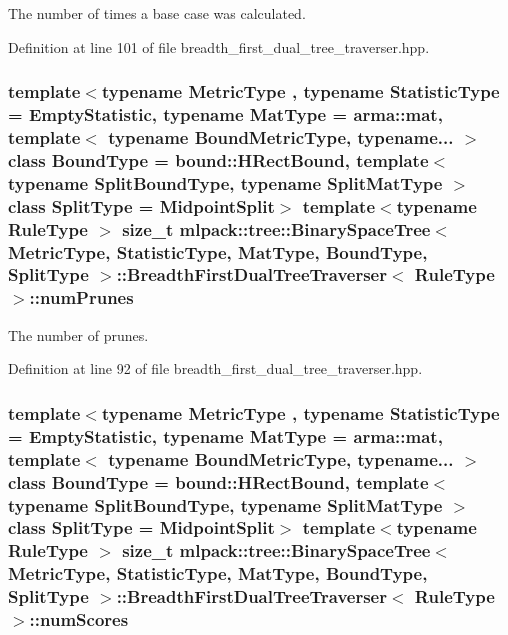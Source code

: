 The number of times a base case was calculated. 



Definition at line 101 of file breadth\+\_\+first\+\_\+dual\+\_\+tree\+\_\+traverser.\+hpp.

\subsubsection[{num\+Prunes}]{\setlength{\rightskip}{0pt plus 5cm}template$<$typename Metric\+Type , typename Statistic\+Type  = Empty\+Statistic, typename Mat\+Type  = arma\+::mat, template$<$ typename Bound\+Metric\+Type, typename... $>$ class Bound\+Type = bound\+::\+H\+Rect\+Bound, template$<$ typename Split\+Bound\+Type, typename Split\+Mat\+Type $>$ class Split\+Type = Midpoint\+Split$>$ template$<$typename Rule\+Type $>$ size\+\_\+t {\bf mlpack\+::tree\+::\+Binary\+Space\+Tree}$<$ Metric\+Type, Statistic\+Type, Mat\+Type, Bound\+Type, Split\+Type $>$\+::{\bf Breadth\+First\+Dual\+Tree\+Traverser}$<$ Rule\+Type $>$\+::num\+Prunes\hspace{0.3cm}{\ttfamily [private]}}\label{classmlpack_1_1tree_1_1BinarySpaceTree_1_1BreadthFirstDualTreeTraverser_a9bded1e8f1cdbbbe673d59a03420179f}


The number of prunes. 



Definition at line 92 of file breadth\+\_\+first\+\_\+dual\+\_\+tree\+\_\+traverser.\+hpp.

\subsubsection[{num\+Scores}]{\setlength{\rightskip}{0pt plus 5cm}template$<$typename Metric\+Type , typename Statistic\+Type  = Empty\+Statistic, typename Mat\+Type  = arma\+::mat, template$<$ typename Bound\+Metric\+Type, typename... $>$ class Bound\+Type = bound\+::\+H\+Rect\+Bound, template$<$ typename Split\+Bound\+Type, typename Split\+Mat\+Type $>$ class Split\+Type = Midpoint\+Split$>$ template$<$typename Rule\+Type $>$ size\+\_\+t {\bf mlpack\+::tree\+::\+Binary\+Space\+Tree}$<$ Metric\+Type, Statistic\+Type, Mat\+Type, Bound\+Type, Split\+Type $>$\+::{\bf Breadth\+First\+Dual\+Tree\+Traverser}$<$ Rule\+Type $>$\+::num\+Scores\hspace{0.3cm}{\ttfamily [private]}}\label{classmlpack_1_1tree_1_1BinarySpaceTree_1_1BreadthFirstDualTreeTraverser_aa83135e31c9e8d1d5b745af29fe9cc37}


